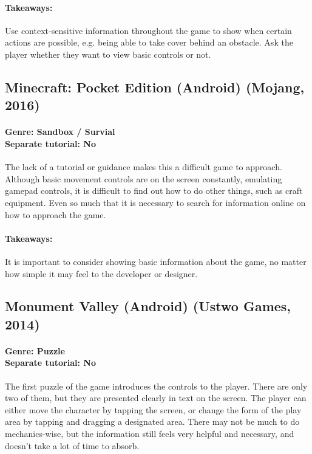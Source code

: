 \paragraph{Takeaways:}
Use context-sensitive information throughout the game to show when certain actions are possible, e.g. being able to take cover behind an obstacle. Ask the player whether they want to view basic controls or not.

\subsection{Minecraft: Pocket Edition (Android) (Mojang, 2016)}
\paragraph{Genre: Sandbox / Survial \\ Separate tutorial: No \\}
The lack of a tutorial or guidance makes this a difficult game to approach. Although basic movement controls are on the screen constantly, emulating gamepad controls, it is difficult to find out how to do other things, such as craft equipment. Even so much that it is necessary to search for information online on how to approach the game. 
\paragraph{Takeaways:}
It is important to consider showing basic information about the game, no matter how simple it may feel to the developer or designer.

\subsection{Monument Valley (Android) (Ustwo Games, 2014)}
\paragraph{Genre: Puzzle \\ Separate tutorial: No \\}
The first puzzle of the game introduces the controls to the player. There are only two of them, but they are presented clearly in text on the screen. The player can either move the character by tapping the screen, or change the form of the play area by tapping and dragging a designated area. There may not be much to do mechanics-wise, but the information still feels very helpful and necessary, and doesn't take a lot of time to absorb.
